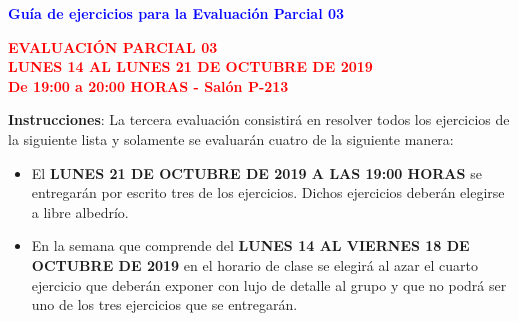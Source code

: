 \documentclass[12pt]{report}
\numberwithin{section}{chapter}
\begin{document}
\begin{center}
\textcolor{blue}{\textbf{\large Guía de ejercicios para la Evaluación Parcial 03}}
\end{center}

\begin{center}
\textcolor{red}{\textbf{\large EVALUACIÓN PARCIAL 03\\
LUNES 14 AL LUNES 21 DE OCTUBRE DE 2019\\
De 19:00 a 20:00 HORAS - Salón P-213}}
\vspace{0.5 cm}
\end{center}

\textbf{Instrucciones}: La tercera evaluación consistirá en resolver todos los ejercicios de la siguiente lista y solamente se evaluarán cuatro de la siguiente manera:
\begin{itemize}
\item El \textbf{LUNES 21 DE OCTUBRE DE 2019 A LAS 19:00 HORAS} se entregarán por escrito tres de los ejercicios. Dichos ejercicios deberán elegirse a libre albedrío.
\item En la semana que comprende del \textbf{LUNES 14 AL VIERNES 18 DE OCTUBRE DE 2019} en el horario de clase se elegirá al azar el cuarto ejercicio que deberán exponer con lujo de detalle al grupo y que no podrá ser uno de los tres ejercicios que se entregarán.\\
\end{itemize}
\end{document}
